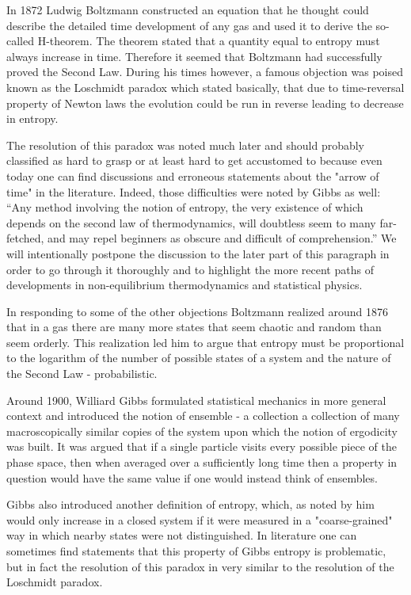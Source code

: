 \documentclass[a4paper,12pt]{article}
\begin{document}
In 1872 Ludwig Boltzmann constructed an equation that he thought could describe the detailed time development of any gas and used it to derive the so-called H-theorem. The theorem stated that a quantity equal to entropy must always increase in time. Therefore it seemed that Boltzmann had successfully proved the Second Law. During his times however, a famous objection was poised known as the Loschmidt paradox which stated basically, that due to time-reversal property of Newton laws the evolution could be run in reverse leading to decrease in entropy. 

The resolution of this paradox was noted much later and should probably classified as hard to grasp or at least hard to get accustomed to because even today one can find discussions and erroneous statements about the "arrow of time" in the literature. Indeed, those difficulties were noted by Gibbs as well\cite{Gibbs:1928tw}:
“Any method involving the notion of entropy, the very existence of which depends on the second law of thermodynamics, will doubtless seem to many far-fetched, and may repel beginners as obscure and difficult of comprehension.” 
We will intentionally postpone the discussion to the later part of this paragraph in order to go through it thoroughly and to highlight the more recent paths of developments in non-equilibrium thermodynamics and statistical physics.

In responding to some of the other objections Boltzmann realized around 1876 that in a gas there are many more states that seem chaotic and random than seem orderly. This realization led him to argue that entropy must be proportional to the logarithm of the number of possible states of a system and the nature of the Second Law - probabilistic.

Around 1900, Williard Gibbs formulated statistical mechanics in more general context and introduced the notion of ensemble - a collection a collection of many macroscopically similar copies of the system upon which the notion of ergodicity was built. 
It was argued that if a single particle visits every possible piece of the phase space, then when averaged over a sufficiently long time then a property in question would have the same value if one would instead think of ensembles. 

Gibbs also introduced another definition of entropy, which, as noted by him \cite{Gibbs:1962bk} would only increase in a closed system if it were measured in a "coarse-grained" way in which nearby states were not distinguished. In literature one can sometimes find statements \cite{Evans:2016tq} that this property of Gibbs entropy is problematic, but in fact the resolution of this paradox in very similar to the resolution of the Loschmidt paradox.
\end{document}
